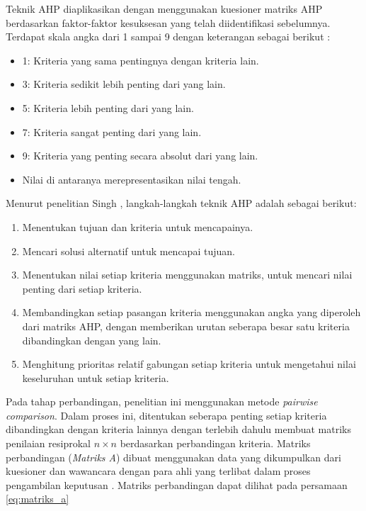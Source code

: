 \documentclass[journal,article,submit,pdftex,moreauthors]{Definitions/mdpi}
\begin{document}
Teknik AHP diaplikasikan dengan menggunakan kuesioner matriks AHP berdasarkan faktor-faktor kesuksesan yang telah diidentifikasi sebelumnya. Terdapat skala angka dari 1 sampai 9 dengan keterangan sebagai berikut \cite{Saaty1990}:
\begin{itemize}
    \item 1: Kriteria yang sama pentingnya dengan kriteria lain.
    \item 3: Kriteria sedikit lebih penting dari yang lain.
    \item 5: Kriteria lebih penting dari yang lain.
    \item 7: Kriteria sangat penting dari yang lain.
    \item 9: Kriteria yang penting secara absolut dari yang lain.
    \item Nilai di antaranya merepresentasikan nilai tengah.
\end{itemize}

Menurut penelitian Singh \cite{Singh2019}, langkah-langkah teknik AHP adalah sebagai berikut:
\begin{enumerate}
    \item Menentukan tujuan dan kriteria untuk mencapainya.
    \item Mencari solusi alternatif untuk mencapai tujuan.
    \item Menentukan nilai setiap kriteria menggunakan matriks, untuk mencari nilai penting dari setiap kriteria.
    \item Membandingkan setiap pasangan kriteria menggunakan angka yang diperoleh dari matriks AHP, dengan memberikan urutan seberapa besar satu kriteria dibandingkan dengan yang lain.
    \item Menghitung prioritas relatif gabungan setiap kriteria untuk mengetahui nilai keseluruhan untuk setiap kriteria.
\end{enumerate}

Pada tahap perbandingan, penelitian ini menggunakan metode \textit{pairwise comparison}. Dalam proses ini, ditentukan seberapa penting setiap kriteria dibandingkan dengan kriteria lainnya dengan terlebih dahulu membuat matriks penilaian resiprokal $n \times n$ berdasarkan perbandingan kriteria. Matriks perbandingan (\textit{Matriks A}) dibuat menggunakan data yang dikumpulkan dari kuesioner dan wawancara dengan para ahli yang terlibat dalam proses pengambilan keputusan \cite{Singh2019}. Matriks perbandingan dapat dilihat pada persamaan \ref{eq:matriks_a}
\end{document}
